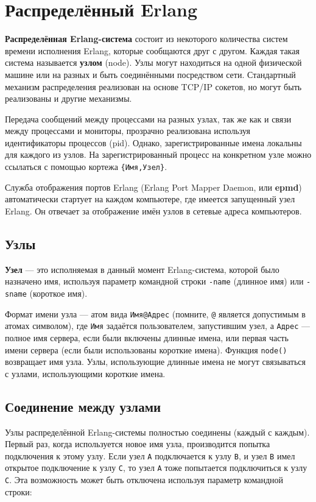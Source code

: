 \chapter{Распределённый Erlang}
\label{distribution}

\textbf{Распределённая Erlang-система} состоит из некоторого количества систем 
времени исполнения Erlang, которые сообщаются друг с другом.  Каждая такая 
система называется \textbf{узлом} (node). Узлы могут находиться на одной
физической машине или на разных и быть соединёнными посредством сети.  
Стандартный механизм распределения реализован на основе TCP/IP сокетов, но 
могут быть реализованы и другие механизмы.

Передача сообщений между процессами на разных узлах, так же как и связи между
процессами и мониторы, прозрачно реализована используя идентификаторы процессов 
(pid).  Однако, зарегистрированные имена локальны для каждого из узлов.  
На зарегистрированный процесс на конкретном узле можно ссылаться с помощью 
кортежа \texttt{\{Имя,Узел\}}.

Служба отображения портов Erlang (Erlang Port Mapper Daemon, или \textbf{epmd}) 
автоматически стартует на каждом компьютере, где имеется запущенный узел Erlang.
Он отвечает за отображение имён узлов в сетевые адреса компьютеров.


\section{Узлы}

\textbf{Узел} --- это исполняемая в данный момент Erlang-система, которой было 
назначено имя, используя параметр командной строки \texttt{-name} (длинное имя)
или \texttt{-sname} (короткое имя).

Формат имени узла --- атом вида \texttt{Имя@Адрес} (помните, \texttt{@} 
является допустимым в атомах символом), где \texttt{Имя} задаётся 
пользователем, запустившим узел, а \texttt{Адрес} --- полное имя сервера, если
были включены длинные имена, или первая часть имени сервера (если были 
использованы короткие имена). Функция \texttt{node()} возвращает имя узла.  
Узлы, использующие длинные имена не могут связываться с узлами, использующими
короткие имена.


\section{Соединение между узлами}

Узлы распределённой Erlang-системы полностью соединены (каждый с каждым). Первый
раз, когда используется новое имя узла, производится попытка подключения к этому
узлу. Если узел \texttt{A} подключается к узлу \texttt{B}, и узел \texttt{B} 
имел открытое подключение к узлу \texttt{C}, то узел \texttt{А} тоже попытается
подключиться к узлу \texttt{C}.  Эта возможность может быть отключена используя
параметр командной строки:

